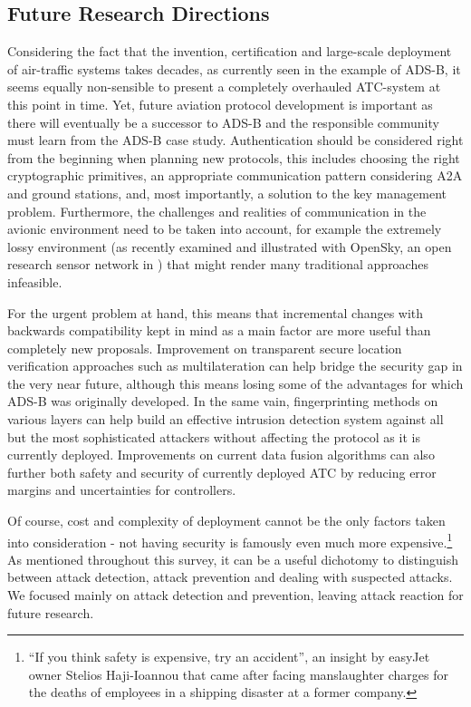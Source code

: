 \documentclass[english]{IEEEtran}
\begin{document}
\subsection*{Future Research Directions}

Considering the fact that the invention, certification and large-scale
deployment of air-traffic systems takes decades, as currently seen
in the example of ADS-B, it seems equally non-sensible to present
a completely overhauled ATC-system at this point in time. Yet, future
aviation protocol development is important as there will eventually
be a successor to ADS-B and the responsible community must learn from
the ADS-B case study. Authentication should be considered right from
the beginning when planning new protocols, this includes choosing
the right cryptographic primitives, an appropriate communication pattern
considering A2A and ground stations, and, most importantly, a solution
to the key management problem. Furthermore, the challenges and realities
of communication in the avionic environment need to be taken into
account, for example the extremely lossy environment (as recently
examined and illustrated with OpenSky, an open research sensor network
in \cite{Strohmeier14,Schaefer14}) that might render many traditional
approaches infeasible.

For the urgent problem at hand, this means that incremental changes
with backwards compatibility kept in mind as a main factor are more
useful than completely new proposals. Improvement on transparent secure
location verification approaches such as multilateration can help
bridge the security gap in the very near future, although this means
losing some of the advantages for which ADS-B was originally developed.
In the same vain, fingerprinting methods on various layers can help
build an effective intrusion detection system against all but the
most sophisticated attackers without affecting the protocol as it
is currently deployed. Improvements on current data fusion algorithms
can also further both safety and security of currently deployed ATC
by reducing error margins and uncertainties for controllers.

Of course, cost and complexity of deployment cannot be the only factors
taken into consideration - not having security is famously even much
more expensive.\footnote{``If you think safety is expensive, try an accident”, an insight
by easyJet owner Stelios Haji-Ioannou that came after facing manslaughter
charges for the deaths of employees in a shipping disaster at a former
company.} As mentioned throughout this survey, it can be a useful dichotomy
to distinguish between attack detection, attack prevention and dealing
with suspected attacks. We focused mainly on attack detection and
prevention, leaving attack reaction for future research. \\
\end{document}
